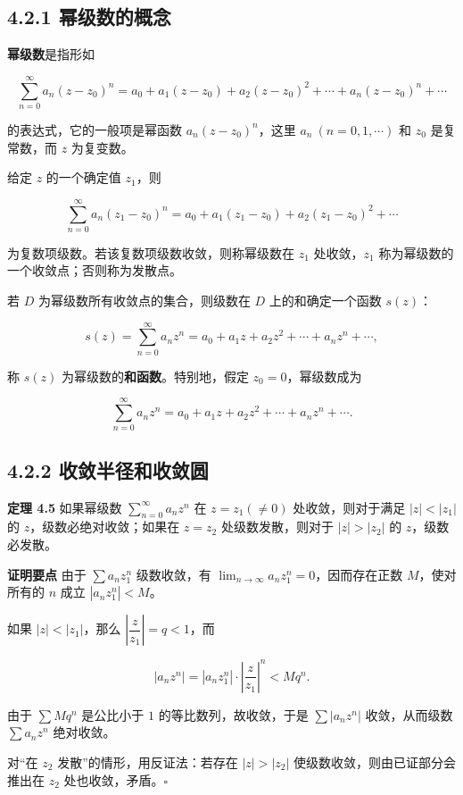 \subsection{4.2.1
幂级数的概念}\label{ux5e42ux7ea7ux6570ux7684ux6982ux5ff5}

\textbf{幂级数}是指形如

\[
\sum_{n=0}^{\infty} a_n(z-z_0)^n=a_0+a_1(z-z_0)+a_2(z-z_0)^2+\cdots+a_n(z-z_0)^n+\cdots
\]

的表达式，它的一般项是幂函数 \(a_n(z-z_0)^n\)，这里
\(a_n\ (n=0,1,\cdots)\) 和 \(z_0\) 是复常数，而 \(z\) 为复变数。

给定 \(z\) 的一个确定值 \(z_1\)，则

\[
\sum_{n=0}^{\infty}a_n(z_1-z_0)^n=a_0+a_1(z_1-z_0)+a_2(z_1-z_0)^2+\cdots
\]

为复数项级数。若该复数项级数收敛，则称幂级数在 \(z_1\) 处收敛，\(z_1\)
称为幂级数的一个收敛点；否则称为发散点。

若 \(D\) 为幂级数所有收敛点的集合，则级数在 \(D\) 上的和确定一个函数
\(s(z)\)：

\[
s(z)=\sum_{n=0}^{\infty}a_n z^n=a_0+a_1 z+a_2 z^2+\cdots+a_n z^n+\cdots,
\]

称 \(s(z)\) 为幂级数的\textbf{和函数}。特别地，假定
\(z_0=0\)，幂级数成为

\[
\sum_{n=0}^{\infty}a_n z^n=a_0+a_1 z+a_2 z^2+\cdots+a_n z^n+\cdots .
\]

\subsection{4.2.2
收敛半径和收敛圆}\label{ux6536ux655bux534aux5f84ux548cux6536ux655bux5706}

\textbf{定理 4.5} 如果幂级数 \(\displaystyle\sum_{n=0}^{\infty}a_n z^n\)
在 \(z=z_1(\neq 0)\) 处收敛，则对于满足 \(|z|<|z_1|\) 的
\(z\)，级数必绝对收敛；如果在 \(z=z_2\) 处级数发散，则对于 \(|z|>|z_2|\)
的 \(z\)，级数必发散。

\textbf{证明要点} 由于 \(\sum a_n z_1^n\) 级数收敛，有
\(\lim_{n\to\infty}a_n z_1^n=0\)，因而存在正数 \(M\)，使对所有的 \(n\)
成立 \(|a_n z_1^n|<M\)。

如果 \(|z|<|z_1|\)，那么 \(\left|\dfrac{z}{z_1}\right|=q<1\)，而

\[
|a_n z^n|=|a_n z_1^n|\cdot\left|\frac{z}{z_1}\right|^n<Mq^n .
\]

由于 \(\sum Mq^n\) 是公比小于 \(1\) 的等比数列，故收敛，于是
\(\sum|a_n z^n|\) 收敛，从而级数 \(\sum a_n z^n\) 绝对收敛。

对``在 \(z_2\) 发散''的情形，用反证法：若存在 \(|z|>|z_2|\)
使级数收敛，则由已证部分会推出在 \(z_2\) 处也收敛，矛盾。\(\square\)

